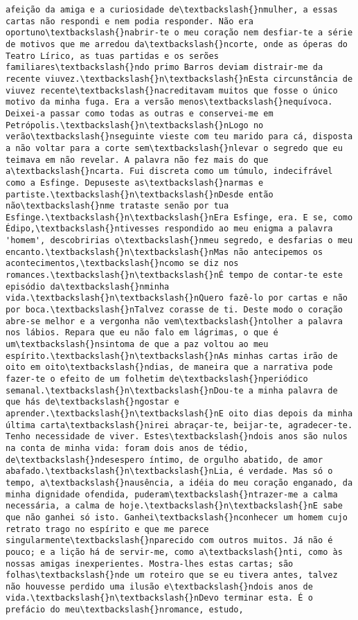 \documentclass[11pt]{article}
\begin{document}
\begin{Verbatim}[commandchars=\\\{\}]
afeição da amiga e a curiosidade de\textbackslash{}nmulher, a essas cartas não respondi e nem podia responder. Não era oportuno\textbackslash{}nabrir-te o meu coração nem desfiar-te a série de motivos que me arredou da\textbackslash{}ncorte, onde as óperas do Teatro Lírico, as tuas partidas e os serões familiares\textbackslash{}ndo primo Barros deviam distrair-me da recente viuvez.\textbackslash{}n\textbackslash{}nEsta circunstância de viuvez recente\textbackslash{}nacreditavam muitos que fosse o único motivo da minha fuga. Era a versão menos\textbackslash{}nequívoca. Deixei-a passar como todas as outras e conservei-me em Petrópolis.\textbackslash{}n\textbackslash{}nLogo no verão\textbackslash{}nseguinte vieste com teu marido para cá, disposta a não voltar para a corte sem\textbackslash{}nlevar o segredo que eu teimava em não revelar. A palavra não fez mais do que a\textbackslash{}ncarta. Fui discreta como um túmulo, indecifrável como a Esfinge. Depuseste as\textbackslash{}narmas e partiste.\textbackslash{}n\textbackslash{}nDesde então não\textbackslash{}nme trataste senão por tua Esfinge.\textbackslash{}n\textbackslash{}nEra Esfinge, era. E se, como Édipo,\textbackslash{}ntivesses respondido ao meu enigma a palavra 'homem', descobririas o\textbackslash{}nmeu segredo, e desfarias o meu encanto.\textbackslash{}n\textbackslash{}nMas não antecipemos os acontecimentos,\textbackslash{}ncomo se diz nos romances.\textbackslash{}n\textbackslash{}nÉ tempo de contar-te este episódio da\textbackslash{}nminha vida.\textbackslash{}n\textbackslash{}nQuero fazê-lo por cartas e não por boca.\textbackslash{}nTalvez corasse de ti. Deste modo o coração abre-se melhor e a vergonha não vem\textbackslash{}ntolher a palavra nos lábios. Repara que eu não falo em lágrimas, o que é um\textbackslash{}nsintoma de que a paz voltou ao meu espírito.\textbackslash{}n\textbackslash{}nAs minhas cartas irão de oito em oito\textbackslash{}ndias, de maneira que a narrativa pode fazer-te o efeito de um folhetim de\textbackslash{}nperiódico semanal.\textbackslash{}n\textbackslash{}nDou-te a minha palavra de que hás de\textbackslash{}ngostar e aprender.\textbackslash{}n\textbackslash{}nE oito dias depois da minha última carta\textbackslash{}nirei abraçar-te, beijar-te, agradecer-te. Tenho necessidade de viver. Estes\textbackslash{}ndois anos são nulos na conta de minha vida: foram dois anos de tédio, de\textbackslash{}ndesespero íntimo, de orgulho abatido, de amor abafado.\textbackslash{}n\textbackslash{}nLia, é verdade. Mas só o tempo, a\textbackslash{}nausência, a idéia do meu coração enganado, da minha dignidade ofendida, puderam\textbackslash{}ntrazer-me a calma necessária, a calma de hoje.\textbackslash{}n\textbackslash{}nE sabe que não ganhei só isto. Ganhei\textbackslash{}nconhecer um homem cujo retrato trago no espírito e que me parece singularmente\textbackslash{}nparecido com outros muitos. Já não é pouco; e a lição há de servir-me, como a\textbackslash{}nti, como às nossas amigas inexperientes. Mostra-lhes estas cartas; são folhas\textbackslash{}nde um roteiro que se eu tivera antes, talvez não houvesse perdido uma ilusão e\textbackslash{}ndois anos de vida.\textbackslash{}n\textbackslash{}nDevo terminar esta. É o prefácio do meu\textbackslash{}nromance, estudo, 
\end{Verbatim}
\end{document}
